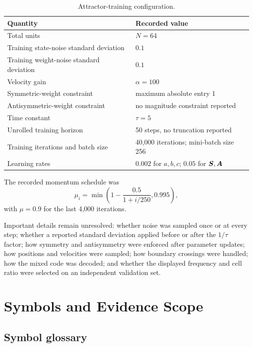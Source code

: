 \begin{table}[htbp]
\centering
\caption{Attractor-training configuration.}
\label{tab:attractor-training-config}
\begin{tabularx}{\textwidth}{@{}lX@{}}
\toprule
Quantity & Recorded value \\
\midrule
Total units & $N=64$ \\
Training state-noise standard deviation & $0.1$ \\
Training weight-noise standard deviation & $0.1$ \\
Velocity gain & $\alpha=100$ \\
Symmetric-weight constraint & maximum absolute entry 1 \\
Antisymmetric-weight constraint & no magnitude constraint reported \\
Time constant & $\tau=5$ \\
Unrolled training horizon & 50 steps, no truncation reported \\
Training iterations and batch size & 40,000 iterations; mini-batch size 256 \\
Learning rates & $0.002$ for $a,b,c$; $0.05$ for $\bm{S},\bm{A}$ \\
\bottomrule
\end{tabularx}
\end{table}

The recorded momentum schedule was
\begin{equation}
\mu_i=\min\left(1-\frac{0.5}{1+i/250},0.995\right),
\end{equation}
with $\mu=0.9$ for the last 4,000 iterations.

Important details remain unresolved: whether noise was sampled once or at every step; whether a reported standard deviation applied before or after the $1/\tau$ factor; how symmetry and antisymmetry were enforced after parameter updates; how positions and velocities were sampled; how boundary crossings were handled; how the mixed code was decoded; and whether the displayed frequency and cell ratio were selected on an independent validation set.

\chapter{Symbols and Evidence Scope}
\label{app:glossary}

\section{Symbol glossary}

